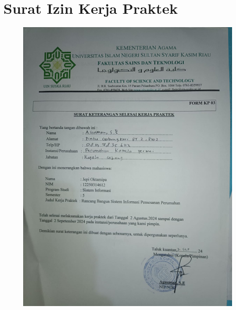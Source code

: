 %


%

\renewcommand{\thepage}{A - \arabic{page}}
\chapter{Surat Izin Kerja Praktek}

\begin{figure}
        \centering
        \includegraphics[width=1.0\linewidth]{lampiran a.jpg}
    \end{figure}
